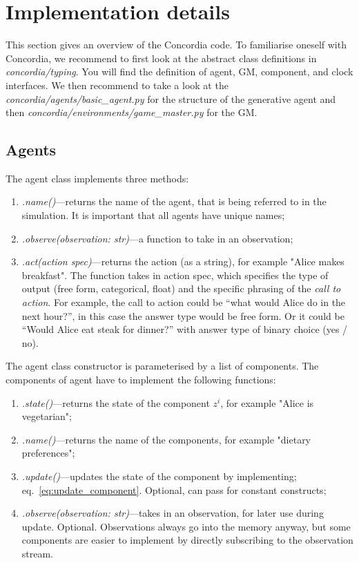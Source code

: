 \documentclass[11pt, a4paper, logo, twocolumn, internal, copyright, numbering]{googledeepmind}
\begin{document}
\appendix
\section{Implementation details}
\label{sec:implementation}
This section gives an overview of the Concordia code.  
To familiarise oneself with Concordia, we recommend to first look at the abstract class definitions in \textit{concordia/typing}. You will find the definition of agent, GM, component, and clock interfaces. We then recommend to take a look at the \textit{concordia/agents/basic\_agent.py} for the structure of the generative agent and then \textit{concordia/environments/game\_master.py} for the GM.

\subsection{Agents}

The agent class implements three methods:
\begin{enumerate}
    \item \textit{.name()}---returns the name of the agent, that is being referred to in the simulation. It is important that all agents have unique names;
    \item \textit{.observe(observation: str)}---a function to take in an observation;
    \item \textit{.act(action spec)}---returns the action (as a string), for example "Alice makes  breakfast". The function takes in action spec, which specifies the type of output (free form, categorical, float) and the specific phrasing of the \textit{call to action}. For example, the call to action could be ``what would Alice do in the next hour?'', in this case the answer type would be free form. Or it could be ``Would Alice eat steak for dinner?'' with answer type of binary choice (yes / no).
\end{enumerate}

The agent class constructor is parameterised by a list of components. The components of agent have to implement the following functions:
\begin{enumerate}
    \item \textit{.state()}---returns the state of the component $z^i$, for example "Alice is vegetarian";
    \item \textit{.name()}---returns the name of the components, for example "dietary preferences";
    \item \textit{.update()}---updates the state of the component by implementing; eq.~\eqref{eq:update_component}. Optional, can pass for constant constructs;
    \item \textit{.observe(observation: str)}---takes in an observation, for later use during update. Optional. Observations always go into the memory anyway, but some components are easier to implement by directly subscribing to the observation stream.
\end{enumerate}
\end{document}
